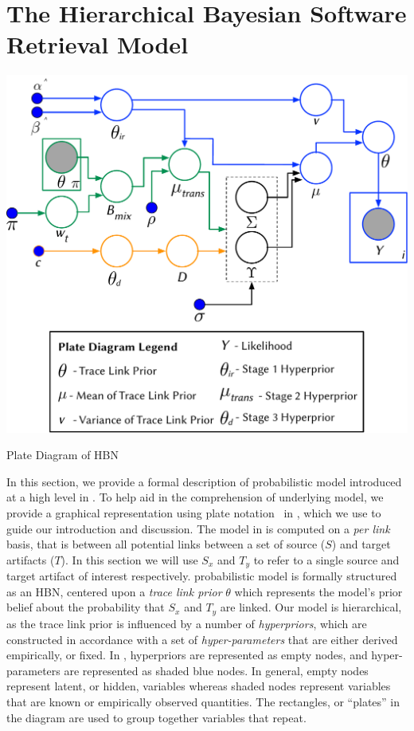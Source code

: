 \section{The Hierarchical Bayesian \hfill \break Software Retrieval Model}
\label{sec:approach-hbn}

\begin{marginfigure}%
\centering

\includegraphics[width=\columnwidth]{graphics/applicationsI-approach/fig1_Model-Plate-Diagram.pdf}

\caption{Plate Diagram of \Comets HBN}
\label{fig:model-approachI}
\end{marginfigure}

In this section, we provide a formal description of \Comets probabilistic model introduced at a high level in  . To help aid in the comprehension of \Comets underlying model, we provide a graphical representation using plate notation~\citep{Murphy:2012} in , which we use to guide our introduction and discussion. The model in  is computed on a \textit{per link} basis, that is between all potential links between a set of source ($S$) and target artifacts ($T$). In this section we will use $S_x$ and $T_y$ to refer to a single source and target artifact of interest respectively. \Comets probabilistic model is formally structured as an HBN, centered upon a \textit{trace link prior} $\theta$ which represents the model's prior belief about the probability that $S_x$ and $T_y$ are linked.  Our model is hierarchical, as the trace link prior is influenced by a number of \textit{hyperpriors}, which are constructed in accordance with a set of \textit{hyper-parameters} that are either derived empirically, or fixed. In , hyperpriors are represented as empty nodes, and hyper-parameters are represented as shaded blue nodes. In general, empty nodes represent latent, or hidden, variables whereas shaded nodes represent variables that are known or empirically observed quantities. The rectangles, or ``plates'' in the diagram are used to group together variables that repeat.

